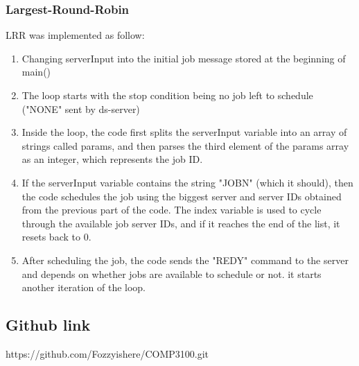 \documentclass[a4paper]{article} %
\begin{document}
\subsubsection{Largest-Round-Robin }
LRR was implemented as follow:
\begin{enumerate}
    \item Changing serverInput into the initial job message stored at the beginning of main() 
    \item The loop starts with the stop condition being no job left to schedule ("NONE" sent by ds-server)
    \item Inside the loop, the code first splits the serverInput variable into an array of strings called params, and then parses the third element of the params array as an integer, which represents the job ID.
    \item If the serverInput variable contains the string "JOBN" (which it should), then the code schedules the job using the biggest server and server IDs obtained from the previous part of the code. The index variable is used to cycle through the available job server IDs, and if it reaches the end of the list, it resets back to 0.
    \item After scheduling the job, the code sends the "REDY" command to the server and depends on whether jobs are available to schedule or not. it starts another iteration of the loop.
\end{enumerate}
\subsection{Github link}
https://github.com/Fozzyishere/COMP3100.git


\bibitem[]{}
\end{document}
